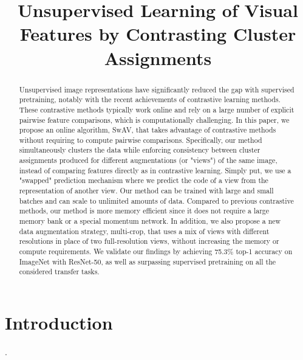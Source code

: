 \documentclass[conference]{IEEEtran}
\begin{document}
\title{Unsupervised Learning of Visual Features by Contrasting Cluster Assignments}

\author{
}

\maketitle

\begin{abstract}
Unsupervised image representations have significantly reduced the gap with supervised pretraining, notably with the recent achievements of contrastive learning methods.
These contrastive methods typically work online and rely on a large number of explicit pairwise feature comparisons, which is computationally challenging.
In this paper, we propose an online algorithm, SwAV, that takes advantage of contrastive methods without requiring to compute pairwise comparisons. 
Specifically, our method simultaneously clusters the data while enforcing consistency between cluster assignments produced for different augmentations (or "views") of the same image, instead of comparing features directly as in contrastive learning.
Simply put, we use a "swapped" prediction mechanism where we predict the code of a view from the representation of another view.
Our method can be trained with large and small batches and can scale to unlimited amounts of data. 
Compared to previous contrastive methods, our method is more memory efficient since it does not require a large memory bank or a special momentum network.
In addition, we also propose a new data augmentation strategy, multi-crop, that uses a mix of views with different resolutions in place of two full-resolution views, without increasing the memory or compute requirements.
We validate our findings by achieving 75.3\% top-1 accuracy on ImageNet with ResNet-50, as well as surpassing supervised pretraining on all the considered transfer tasks.
\end{abstract}

\section{Introduction}
\cite{b1}.
\end{document}
